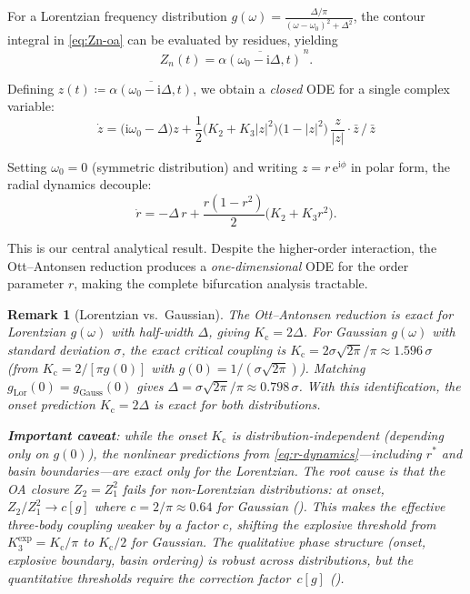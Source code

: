 \documentclass{article}
\newtheorem{remark}{Remark}
\newcommand{\ii}{\mathrm{i}}
\newcommand{\ee}{\mathrm{e}}
\newcommand{\Kc}{K_{\mathrm{c}}}
\begin{document}
For a Lorentzian frequency distribution $g(\omega) =
\frac{\Delta/\pi}{(\omega-\omega_0)^2+\Delta^2}$, the contour integral in
\eqref{eq:Zn-oa} can be evaluated by residues, yielding
\begin{equation}
  Z_n(t) = \overline{\alpha(\omega_0 - \ii\Delta, t)}^{\,n}.
  \label{eq:Zn-lorentzian}
\end{equation}

Defining $z(t) \coloneqq \overline{\alpha(\omega_0-\ii\Delta,t)}$, we obtain a
\emph{closed} ODE for a single complex variable:
\begin{equation}
  \boxed{
  \dot{z} = \bigl(\ii\omega_0 - \Delta\bigr)z
  + \frac{1}{2}\bigl(K_2 + K_3|z|^2\bigr)\bigl(1 - |z|^2\bigr)\,
  \frac{z}{|z|}\cdot\bar{z}\,/\,\bar{z}
  }
  \label{eq:z-ode-raw}
\end{equation}

Setting $\omega_0=0$ (symmetric distribution) and writing $z=r\,\ee^{\ii\phi}$
in polar form, the radial dynamics decouple:
\begin{equation}
  \boxed{
  \dot{r} = -\Delta\,r + \frac{r(1-r^2)}{2}\bigl(K_2 + K_3 r^2\bigr).
  }
  \label{eq:r-dynamics}
\end{equation}

This is our central analytical result.  Despite the higher-order interaction,
the Ott--Antonsen reduction produces a \emph{one-dimensional} ODE for the order
parameter $r$, making the complete bifurcation analysis tractable.

\begin{remark}[Lorentzian vs.\ Gaussian]
  The Ott--Antonsen reduction is exact for Lorentzian $g(\omega)$ with
  half-width $\Delta$, giving $\Kc=2\Delta$.  For Gaussian $g(\omega)$ with
  standard deviation $\sigma$, the exact critical coupling is
  $\Kc = 2\sigma\sqrt{2\pi}/\pi \approx 1.596\,\sigma$
  (from $\Kc=2/[\pi g(0)]$ with $g(0)=1/(\sigma\sqrt{2\pi})$).
  Matching $g_{\mathrm{Lor}}(0) = g_{\mathrm{Gauss}}(0)$ gives
  $\Delta = \sigma\sqrt{2\pi}/\pi \approx 0.798\,\sigma$.
  With this identification, the onset prediction $\Kc=2\Delta$ is exact for
  both distributions.

  \textbf{Important caveat}: while the onset $\Kc$ is distribution-independent
  (depending only on $g(0)$), the nonlinear predictions from
  \eqref{eq:r-dynamics}---including $r^*$ and basin boundaries---are exact
  only for the Lorentzian.  The root cause is that the OA closure
  $Z_2=Z_1^2$ fails for non-Lorentzian distributions: at onset,
  $Z_2/Z_1^2 \to c[g]$ where $c=2/\pi\approx 0.64$ for Gaussian
  ().  This makes the effective three-body coupling
  weaker by a factor $c$, shifting the explosive threshold from
  $K_3^{\mathrm{exp}}=\Kc/\pi$ to $\Kc/2$ for Gaussian.
  The \emph{qualitative} phase structure (onset, explosive
  boundary, basin ordering) is robust across distributions, but the
  \emph{quantitative} thresholds require the correction factor~$c[g]$
  ().
\end{remark}
\end{document}
